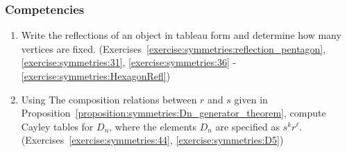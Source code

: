 \subsubsection*{Competencies}
\begin{enumerate}
\item
Write the reflections of an object in tableau form and determine how many vertices are fixed. (Exercises~\ref{exercise:symmetries:reflection_pentagon}, \ref{exercise:symmetries:31}, \ref{exercise:symmetries:36} - \ref{exercise:symmetries:HexagonRefl})
\item
Using  The composition relations between $r$ and $s$ given in  Proposition~\ref{proposition:symmetries:Dn_generator_theorem}, compute Cayley tables for $D_n$, where the elements $D_n$ are specified as $s^k r^\ell$. (Exercises~\ref{exercise:symmetries:44}, \ref{exercise:symmetries:D5})
\end{enumerate}







